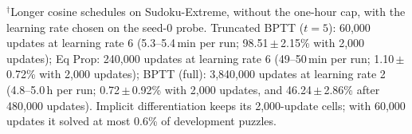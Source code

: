 \documentclass{article}
\begin{document}
\begin{table}[!ht]
\begin{tabular}{@{}l rrr rrr@{}}
\bottomrule
\end{tabular}
\endgroup
\par\smallskip
{\scriptsize\color{black!55}\raggedright $^{\dagger}$Longer cosine schedules on Sudoku-Extreme, without the one-hour cap, with the learning rate chosen on the seed-0 probe.
Truncated BPTT ($t{=}5$): 60,000 updates at learning rate 6 (5.3--5.4\,min per run; 98.51\,$\pm$\,2.15\% with 2,000 updates);
Eq Prop: 240,000 updates at learning rate 6 (49--50\,min per run; 1.10\,$\pm$\,0.72\% with 2,000 updates);
BPTT (full): 3,840,000 updates at learning rate 2 (4.8--5.0\,h per run; 0.72\,$\pm$\,0.92\% with 2,000 updates, and 46.24\,$\pm$\,2.86\% after 480,000 updates).
Implicit differentiation keeps its 2,000-update cells; with 60,000 updates it solved at most 0.6\% of development puzzles.\par}
\end{table}
  
\FloatBarrier
%
%
%
%
\end{document}
